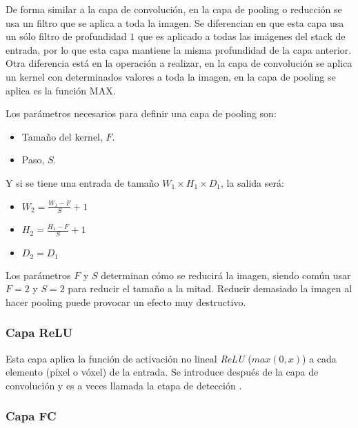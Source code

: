 De forma similar a la capa de convolución, en la capa de pooling o reducción se usa un filtro que se aplica a toda la imagen. Se diferencian en que esta capa usa un sólo filtro de profundidad $1$ que es aplicado a todas las imágenes del stack de entrada, por lo que esta capa mantiene la misma profundidad de la capa anterior. Otra diferencia está en la operación a realizar, en la capa de convolución se aplica un kernel con determinados valores a toda la imagen, en la capa de pooling se aplica es la función MAX.

Los parámetros necesarios para definir una capa de pooling son:
\begin{itemize}
\item Tamaño del kernel, $F$.
\item Paso, $S$.
\end{itemize} 

Y si se tiene una entrada de tamaño $W_1 \times H_1 \times D_1$, la salida será:
\begin{itemize}
\item $W_2 = \frac{W_1 - F}{S} + 1$
\item $H_2 = \frac{H_1 - F}{S} + 1$
\item $D_2 = D_1$
\end{itemize}

Los parámetros $F$ y $S$ determinan cómo se reducirá la imagen, siendo común usar $F=2$ y $S=2$ para reducir el tamaño a la mitad. Reducir demasiado la imagen al hacer pooling puede provocar un efecto muy destructivo.


\subsubsection{Capa ReLU}

Esta capa aplica la función de activación no lineal \textit{ReLU} ($max(0,x)$) a cada elemento (píxel o vóxel) de la entrada. Se introduce después de la capa de convolución y es a veces llamada la etapa de detección \cite[335]{Goodfellow2016}.

\subsubsection{Capa FC}

